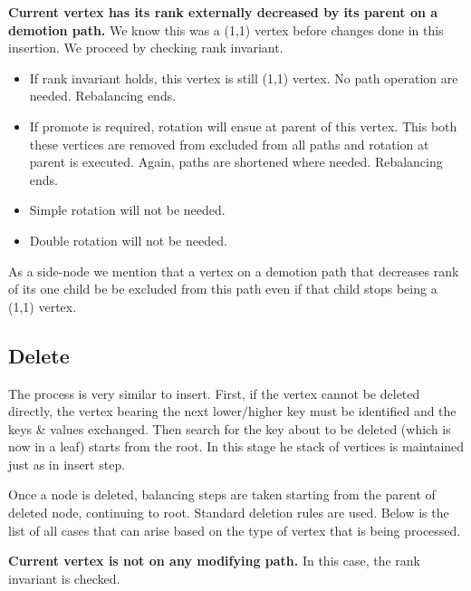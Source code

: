 \textbf{Current vertex has its rank externally decreased by its parent on a demotion path.} We know this was a (1,1) vertex before changes done in this insertion. We proceed by checking rank invariant. 

\begin{itemize}

\item If rank invariant holds, this vertex is still (1,1) vertex. No path operation are needed. Rebalancing ends.

\item If promote is required, rotation will ensue at parent of this vertex. This both these vertices are removed from excluded from all paths and rotation at parent is executed. Again, paths are shortened where needed. Rebalancing ends.

\item Simple rotation will not be needed.

\item Double rotation will not be needed.

\end{itemize}

As a side-node we mention that a vertex on a demotion path that decreases rank of its one child be be excluded from this path even if that child stops being a (1,1) vertex.

\subsection{Delete}

The process is very similar to insert. First, if the vertex cannot be deleted directly, the vertex bearing the next lower/higher key must be identified and the keys \& values exchanged. Then search for the key about to be deleted (which is now in a leaf) starts from the root. In this stage he stack of vertices is maintained just as in insert step. 

Once a node is deleted, balancing steps are taken starting from the parent of deleted node, continuing to root. Standard deletion rules are used. Below is the list of all cases that can arise based on the type of vertex that is being processed.

\textbf{Current vertex is not on any modifying path.} In this case, the rank invariant is checked. 

